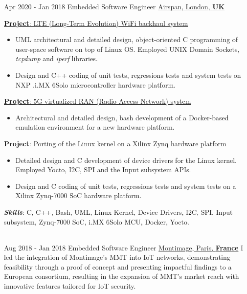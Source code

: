 \documentclass[letterpaper]{twentysecondcv} %
\begin{document}
\begin{twenty}
    \twentyitem
    	{Apr 2020 -}
		{Jan 2018}
        {Embedded Software Engineer}
        {\href{https://www.airspan.com/}{Airspan, London, \textbf{UK}}}
        {}
        {
            \vspace{2 mm}
            \underline{\textbf{Project}: LTE (Long-Term Evolution) WiFi backhaul system}

            \vspace{2 mm}
            \begin{itemize}
                \item UML architectural and detailed design, object-oriented C programming of user-space software on top of Linux OS. Employed UNIX Domain Sockets, \textit{tcpdump} and \textit{iperf} libraries.
                \item Design and C++ coding of unit tests, regressions tests and system tests on NXP .i.MX 6Solo microcontroller hardware platform.
            \end{itemize}

            \vspace{2 mm}
            \underline{\textbf{Project}: 5G virtualized RAN (Radio Access Network) system}

            \vspace{2 mm}
            \begin{itemize}
                \item Architectural and detailed design, bash development of a Docker-based emulation environment for a new hardware platform.
            \end{itemize}

            \vspace{2 mm}
            \underline{\textbf{Project}: Porting of the Linux kernel on a Xilinx Zynq hardware platform}

            \vspace{2 mm}
            \begin{itemize}
                \item Detailed design and C development of device drivers for the Linux kernel. Employed Yocto, I2C, SPI and the Input subsystem APIs.
                \item Design and C coding of unit tests, regressions tests and system tests on a Xilinx Zynq-7000 SoC hardware platform.
            \end{itemize}

            \vspace{2 mm}
            \textbf{\textit{Skills}}: C, C++, Bash, UML, Linux Kernel, Device Drivers, I2C, SPI, Input subsystem, Zynq-7000 SoC, i.MX 6Solo MCU, Docker, Yocto.
    }\\
    \twentyitem
    {Aug 2018 -}
    {Jan 2018}
    {Embedded Software Engineer}
    {\href{https://www.montimage.com/}{Montimage, Paris, \textbf{France}}}
    {}
    {
        I led the integration of Montimage's MMT into IoT networks, demonstrating feasibility through a proof of concept and presenting impactful findings to a European consortium, resulting in the expansion of MMT's market reach with innovative features tailored for IoT security.
    }
\end{twenty}
\end{document}
